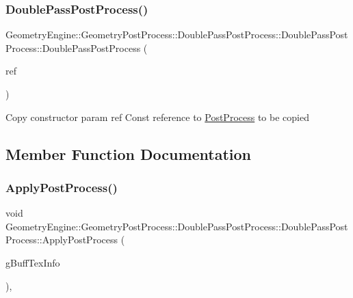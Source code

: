 \subsubsection{\texorpdfstring{DoublePassPostProcess()}{DoublePassPostProcess()}\hspace{0.1cm}{\footnotesize\ttfamily [2/2]}}
{\footnotesize\ttfamily Geometry\+Engine\+::\+Geometry\+Post\+Process\+::\+Double\+Pass\+Post\+Process\+::\+Double\+Pass\+Post\+Process\+::\+Double\+Pass\+Post\+Process (\begin{DoxyParamCaption}\item[{const \mbox{\hyperlink{class_geometry_engine_1_1_geometry_post_process_1_1_double_pass_post_process_1_1_double_pass_post_process}{Double\+Pass\+Post\+Process}} \&}]{ref }\end{DoxyParamCaption})\hspace{0.3cm}{\ttfamily [inline]}}

Copy constructor param ref Const reference to \mbox{\hyperlink{class_geometry_engine_1_1_geometry_post_process_1_1_post_process}{Post\+Process}} to be copied 

\subsection{Member Function Documentation}
\mbox{\label{class_geometry_engine_1_1_geometry_post_process_1_1_double_pass_post_process_1_1_double_pass_post_process_a9d2674bc5b237ed2e494d1c88f63d29e}} 
\subsubsection{\texorpdfstring{ApplyPostProcess()}{ApplyPostProcess()}}
{\footnotesize\ttfamily void Geometry\+Engine\+::\+Geometry\+Post\+Process\+::\+Double\+Pass\+Post\+Process\+::\+Double\+Pass\+Post\+Process\+::\+Apply\+Post\+Process (\begin{DoxyParamCaption}\item[{const \mbox{\hyperlink{class_geometry_engine_1_1_g_buffer_texture_info}{G\+Buffer\+Texture\+Info}} \&}]{g\+Buff\+Tex\+Info }\end{DoxyParamCaption})\hspace{0.3cm}{\ttfamily [override]}, {\ttfamily [virtual]}}

